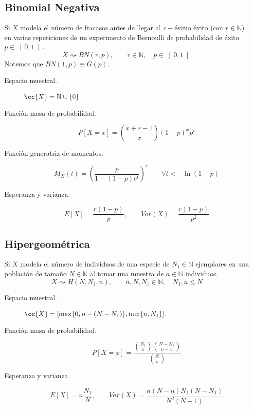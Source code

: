\subsection{Binomial Negativa}
\noindent
Si $X$ modela el número de fracasos antes de llegar al $r-$ésimo éxito (con $r\in \mathbb{N}$) en varias repeticiones de un experimento de Bernoulli de probabilidad de éxito $p\in \left]0,1\right[$.
\begin{equation*}
    X\rightsquigarrow BN(r,p), \qquad r\in \mathbb{N},\quad p\in \left]0,1\right[
\end{equation*}
Notemos que $BN(1,p)\equiv G(p)$.
\begin{description}
    \item [Espacio muestral.] $\cc{X} = \mathbb{N}\cup \{0\}$.
    \item [Función masa de probabilidad.] 
        \begin{equation*}
            P[X=x] = \binom{x+r-1}{x} {(1-p)}^{x}p^r
        \end{equation*}
    \item [Función generatriz de momentos.] 
        \begin{equation*}
            M_X(t) = {(\dfrac{p}{1-(1-p)e^t})}^{r} \qquad \forall t < -\ln (1-p)
        \end{equation*}
    \item [Esperanza y varianza.] 
        \begin{equation*}
            E[X] = \dfrac{r(1-p)}{p},\qquad Var(X) = \dfrac{r(1-p)}{p^2}
        \end{equation*}
\end{description}

\subsection{Hipergeométrica}
\noindent
Si $X$ modela el número de individuos de una especie de $N_1\in \mathbb{N}$ ejemplares en una población de tamaño $N\in \mathbb{N}$ al tomar una muestra de $n\in \mathbb{N}$ individuos.
\begin{equation*}
    X\rightsquigarrow H(N,N_1,n), \qquad n,N,N_1\in \mathbb{N}, \quad N_1,n\leq N
\end{equation*}
\begin{description}
    \item [Espacio muestral.] $\cc{X} = [\max\{0,n-(N-N_1)\}, \min\{n,N_1\}]$.
    \item [Función masa de probabilidad.] 
        \begin{equation*}
            P[X=x] = \dfrac{\binom{N_1}{x}\binom{N-N_1}{n-x}}{\binom{N}{n}}
        \end{equation*}
    \item [Esperanza y varianza.] 
        \begin{equation*}
            E[X] = n\dfrac{N_1}{N}, \qquad Var(X) = \dfrac{n(N-n)N_1(N-N_1)}{N^2(N-1)}
        \end{equation*}
\end{description}

